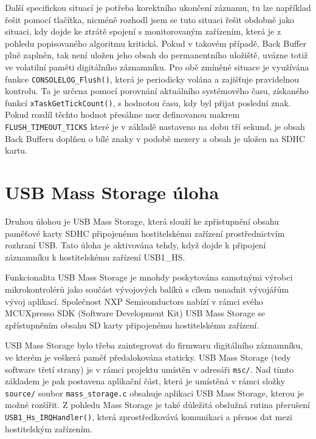 \newpage

Další specifickou situací je potřeba korektního ukončení záznamu, tu lze například řešit pomocí tlačítka, nicméně rozhodl jsem se tuto situaci řešit obdobně jako situaci, kdy dojde ke ztrátě spojení s monitorovaným zařízením, která je z pohledu popisovaného algoritmu kritická. Pokud v takovém případě, Back Buffer plně zaplněn, tak není uložen jeho obsah do permanentního uložiště, uvázne totiž ve volatilní paměti digitálního záznamníku. Pro obě zmíněné situace je využívána funkce \texttt{CONSOLELOG\_Flush()},  která je periodicky volána a zajišťuje pravidelnou kontrolu. Ta je určena pomocí porovnání aktuálního systémového času, získaného funkcí \texttt{xTaskGetTickCount()}, s hodnotou času, kdy byl přijat poslední znak. Pokud rozdíl těchto hodnot přesáhne mez definovanou makrem \texttt{FLUSH\_TIMEOUT\_TICKS} které je v základě nastaveno na dobu tří sekund, je obsah Back Bufferu doplňen o bílé znaky v podobě mezery a obsah je uložen na SDHC kartu.


\section{USB Mass Storage úloha}
Druhou úlohou je USB Mass Storage, která slouží ke zpřístupnění obsahu paměťové karty SDHC připojenému hostitelskému zařízení prostřednictvím rozhraní USB. Tato úloha je aktivována tehdy, když dojde k připojení záznamníku k hostitelskému zařízení USB1\_HS.

Funkcionalita USB Mass Storage je mnohdy poskytována samotnými výrobci mikrokontrolérů jako součást vývojových balíků s cílem usnadnit vývojářům vývoj aplikací. Společnost NXP Semiconductors nabízí v rámci svého MCUXpresso SDK (Software Development Kit) USB Mass Storage se zpřístupněním obsahu SD karty připojenému hostitelskému zařízení.

USB Mass Storage bylo třeba zaintegrovat do firmwaru digitálního záznamníku, ve kterém je veškerá paměť předalokována staticky. USB Mass Storage (tedy software třetí strany) je v rámci projektu umístěn v adresáři \texttt{msc/}. Nad tímto základem je pak postavena aplikační část, která je umístěná v rámci složky \texttt{source/} soubor \texttt{mass\_storage.c} obsahuje aplikaci USB Mass Storage, kterou je možné rozšířit. Z pohledu Mass Storage je také důležitá obslužná rutina přerušení \texttt{USB1\_Hs\_IRQHandler()}, která zprostředkovává komunikaci a přenos dat mezi hostitelským zařízením.

